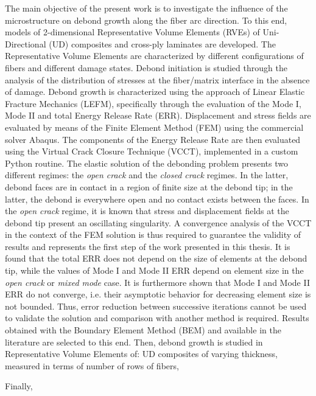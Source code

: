 The main objective of the present work is to investigate the influence of the microstructure on debond growth along the fiber arc direction. To this end, models of 2-dimensional Representative Volume Elements (RVEs) of Uni-Directional (UD) composites and cross-ply laminates are developed. The Representative Volume Elements are characterized by different configurations of fibers and different damage states. Debond initiation is studied through the analysis of the distribution of stresses at the fiber/matrix interface in the absence of damage. Debond growth is characterized using the approach of Linear Elastic Fracture Mechanics (LEFM), specifically through the evaluation of the Mode I, Mode II and total Energy Release Rate (ERR). Displacement and stress fields are evaluated by means of the Finite Element Method (FEM) using the commercial solver Abaqus. The components of the Energy Release Rate are then evaluated using the Virtual Crack Closure Technique (VCCT), implemented in a custom Python routine. The elastic solution of the debonding problem presents two different regimes: the \emph{open crack} and the \emph{closed crack} regimes. In the latter, debond faces are in contact in a region of finite size at the debond tip; in the latter, the debond is everywhere open and no contact exists between the faces. In the \emph{open crack} regime, it is known that stress and displacement fields at the debond tip present an oscillating singularity. A convergence analysis of the VCCT in the context of the FEM solution is thus required to guarantee the validity of results and represents the first step of the work presented in this thesis. It is found that the total ERR does not depend on the size of elements at the debond tip, while the values of Mode I and Mode II ERR depend on element size in the \emph{open crack} or \emph{mixed mode} case. It is furthermore shown that Mode I and Mode II ERR do not converge, i.e. their asymptotic behavior for decreasing element size is not bounded. Thus, error reduction between successive iterations cannot be used to validate the solution and comparison with another method is required. Results obtained with the Boundary Element Method (BEM) and available in the literature are selected to this end. Then, debond growth is studied in Representative Volume Elements of: UD composites of varying thickness, measured in terms of number of rows of fibers, 

Finally,
